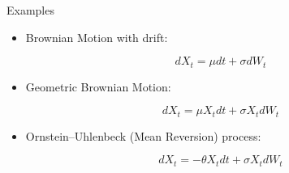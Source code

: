 \documentclass[11pt]{beamer}
\begin{document}
\begin{frame}{Examples}

\begin{itemize}

\item Brownian Motion with drift: 

$$ dX_t = \mu dt + \sigma dW_t $$

\item Geometric Brownian Motion: 

$$ dX_t = \mu X_t dt + \sigma X_t dW_t $$

\item Ornstein–Uhlenbeck (Mean Reversion) process:

$$ dX_t = -\theta X_t dt + \sigma X_t dW_t $$

\end{itemize}

\end{frame}
\end{document}
